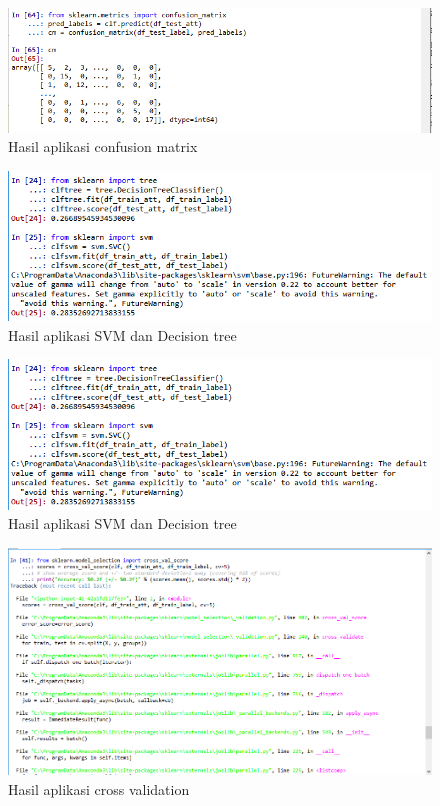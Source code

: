\begin{figure}[ht]
      \centerline{\includegraphics[width=1\textwidth]
      {figures/cokro/c45}}
      \caption{Hasil aplikasi confusion matrix}
      \label{c45}
      \end{figure}

\begin{figure}[ht]
      \centerline{\includegraphics[width=1\textwidth]
      {figures/cokro/c46}}
      \caption{Hasil aplikasi SVM dan Decision tree}
      \label{c46}
      \end{figure}

\begin{figure}[ht]
      \centerline{\includegraphics[width=1\textwidth]
      {figures/cokro/c46}}
      \caption{Hasil aplikasi SVM dan Decision tree}
      \label{c46}
      \end{figure}

\begin{figure}[ht]
      \centerline{\includegraphics[width=1\textwidth]
      {figures/cokro/c47}}
      \caption{Hasil aplikasi cross validation}
      \label{c47}
      \end{figure}

